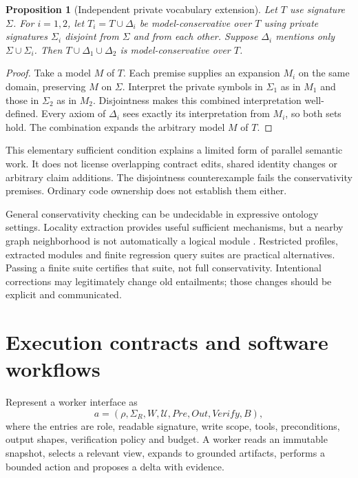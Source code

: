 \documentclass[11pt]{article}
\newtheorem{proposition}{Proposition}\newtheorem{definition}{Definition}
\begin{document}
\begin{proposition}[Independent private vocabulary extension]
Let $T$ use signature $\Sigma$. For $i=1,2$, let $T_i=T\cup\Delta_i$ be model-conservative over $T$ using private signatures $\Sigma_i$ disjoint from $\Sigma$ and from each other. Suppose $\Delta_i$ mentions only $\Sigma\cup\Sigma_i$. Then $T\cup\Delta_1\cup\Delta_2$ is model-conservative over $T$.
\end{proposition}
\begin{proof}
Take a model $M$ of $T$. Each premise supplies an expansion $M_i$ on the same domain, preserving $M$ on $\Sigma$. Interpret the private symbols in $\Sigma_1$ as in $M_1$ and those in $\Sigma_2$ as in $M_2$. Disjointness makes this combined interpretation well-defined. Every axiom of $\Delta_i$ sees exactly its interpretation from $M_i$, so both sets hold. The combination expands the arbitrary model $M$ of $T$.
\end{proof}
This elementary sufficient condition explains a limited form of parallel semantic work. It does not license overlapping contract edits, shared identity changes or arbitrary claim additions. The disjointness counterexample fails the conservativity premises. Ordinary code ownership does not establish them either.

General conservativity checking can be undecidable in expressive ontology settings. Locality extraction provides useful sufficient mechanisms, but a nearby graph neighborhood is not automatically a logical module \citep{modularity2008}. Restricted profiles, extracted modules and finite regression query suites are practical alternatives. Passing a finite suite certifies that suite, not full conservativity. Intentional corrections may legitimately change old entailments; those changes should be explicit and communicated.

\section{Execution contracts and software workflows}
Represent a worker interface as
\begin{equation}
a=(\rho,\Sigma_R,W,\mathcal U,\mathit{Pre},\mathit{Out},\mathit{Verify},B),
\end{equation}
where the entries are role, readable signature, write scope, tools, preconditions, output shapes, verification policy and budget. A worker reads an immutable snapshot, selects a relevant view, expands to grounded artifacts, performs a bounded action and proposes a delta with evidence.
\end{document}
